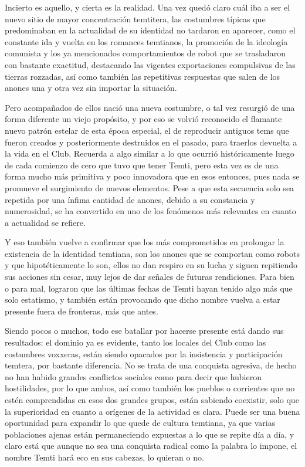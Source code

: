 \documentclass[
]{book}
\begin{document}
Incierto es aquello, y cierta es la realidad. Una vez quedó claro cuál iba a ser el nuevo sitio de mayor concentración temtitera, las costumbres típicas que predominaban en la actualidad de su identidad no tardaron en aparecer, como el constante ida y vuelta en los romances temtianos, la promoción de la ideología comunista y los ya mencionados comportamientos de robot que se trasladaron con bastante exactitud, destacando las vigentes exportaciones compulsivas de las tierras rozzadas, así como también las repetitivas respuestas que salen de los anones una y otra vez sin importar la situación.

Pero acompañados de ellos nació una nueva costumbre, o tal vez resurgió de una forma diferente un viejo propósito, y por eso se volvió reconocido el flamante nuevo patrón estelar de esta época especial, el de reproducir antiguos tems que fueron creados y posteriormente destruidos en el pasado, para traerlos devuelta a la vida en el Club. Recuerda a algo similar a lo que ocurrió históricamente luego de cada comienzo de cero que tuvo que tener Temti, pero esta vez es de una forma mucho más primitiva y poco innovadora que en esos entonces, pues nada se promueve el surgimiento de nuevos elementos. Pese a que esta secuencia solo sea repetida por una ínfima cantidad de anones, debido a su constancia y numerosidad, se ha convertido en uno de los fenómenos más relevantes en cuanto a actualidad se refiere.

Y eso también vuelve a confirmar que los más comprometidos en prolongar la existencia de la identidad temtiana, son los anones que se comportan como robots y que hipotéticamente lo son, ellos no dan respiro en su lucha y siguen repitiendo sus acciones sin cesar, muy lejos de dar señales de futuras rendiciones. Para bien o para mal, lograron que las últimas fechas de Temti hayan tenido algo más que solo estatismo, y también están provocando que dicho nombre vuelva a estar presente fuera de fronteras, más que antes.

Siendo pocos o muchos, todo ese batallar por hacerse presente está dando sus resultados: el dominio ya es evidente, tanto los locales del Club como las costumbres voxxeras, están siendo opacados por la insistencia y participación temtera, por bastante diferencia. No se trata de una conquista agresiva, de hecho no han habido grandes conflictos sociales como para decir que hubieron hostilidades, por lo que ambos, así como también los pueblos o corrientes que no estén comprendidas en esos dos grandes grupos, están sabiendo coexistir, solo que la superioridad en cuanto a orígenes de la actividad es clara. Puede ser una buena oportunidad para expandir lo que quede de cultura temtiana, ya que varias poblaciones ajenas están permaneciendo expuestas a lo que se repite día a día, y claro está que aunque no sea una conquista radical como la palabra lo impone, el nombre Temti hará eco en sus cabezas, lo quieran o no.
\end{document}
